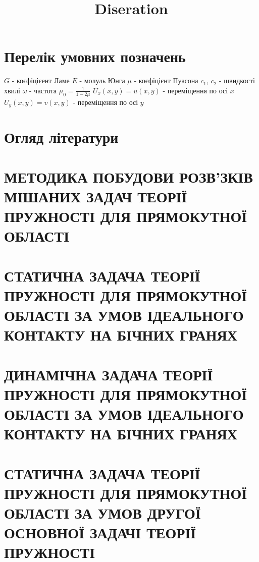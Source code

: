 \documentclass[a4paper,14pt]{extarticle}
\title{Diseration}
\author{}
\date{}
\numberwithin{equation}{section}
\begin{document}
\newpage

\renewcommand{\contentsname}{\centering Зміст}
\tableofcontents

\newpage

\section*{\centering Перелік умовних позначень}
$G$ - коєфіцієент Ламе \newline
$E$ - молуль Юнга \newline
$\mu$ - коєфіцієнт Пуасона \newline
$c_1$, $c_2$ - швидкості хвилі \newline
$\omega$ - частота \newline
$\mu_0 = \frac{1}{1 - 2\mu}$ \newline
$U_x(x,y) = u(x,y)$ - переміщення по осі $x$ \newline
$U_y(x,y) = v(x,y)$ - переміщення по осі $y$
\newpage

\section{Огляд літератури}
\newpage

\section{МЕТОДИКА ПОБУДОВИ РОЗВ’ЗКІВ МІШАНИХ ЗАДАЧ ТЕОРІЇ ПРУЖНОСТІ ДЛЯ ПРЯМОКУТНОЇ ОБЛАСТІ}

\newpage

\section{СТАТИЧНА ЗАДАЧА ТЕОРІЇ ПРУЖНОСТІ ДЛЯ ПРЯМОКУТНОЇ ОБЛАСТІ
ЗА УМОВ ІДЕАЛЬНОГО КОНТАКТУ НА БІЧНИХ ГРАНЯХ}

\newpage

\section{ДИНАМІЧНА ЗАДАЧА ТЕОРІЇ ПРУЖНОСТІ ДЛЯ ПРЯМОКУТНОЇ ОБЛАСТІ
ЗА УМОВ ІДЕАЛЬНОГО КОНТАКТУ НА БІЧНИХ ГРАНЯХ}

\newpage

\section{СТАТИЧНА ЗАДАЧА ТЕОРІЇ ПРУЖНОСТІ ДЛЯ ПРЯМОКУТНОЇ ОБЛАСТІ
ЗА УМОВ ДРУГОЇ ОСНОВНОЇ ЗАДАЧІ ТЕОРІЇ ПРУЖНОСТІ}

\newpage
\end{document}
